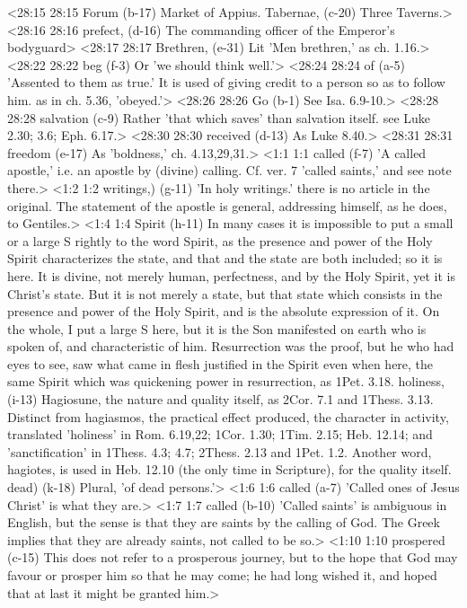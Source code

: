 <28:15 28:15  Forum (b-17)  Market of Appius.
  Tabernae, (c-20)  Three Taverns.>
<28:16 28:16  prefect, (d-16)  The commanding officer of the Emperor's bodyguard>
<28:17 28:17  Brethren, (e-31)  Lit 'Men brethren,' as ch. 1.16.>
<28:22 28:22  beg (f-3)  Or 'we should think well.'>
<28:24 28:24  of (a-5)  'Assented to them as true.' It is used of giving credit to a  person so as to follow him. as in ch. 5.36, 'obeyed.'>
<28:26 28:26  Go (b-1)  See Isa. 6.9-10.>
<28:28 28:28  salvation (c-9)  Rather 'that which saves' than salvation itself. see Luke  2.30; 3.6; Eph. 6.17.>
<28:30 28:30  received (d-13)  As Luke 8.40.>
<28:31 28:31  freedom (e-17)  As 'boldness,' ch. 4.13,29,31.>
<1:1 1:1  called (f-7)  'A called apostle,' i.e. an apostle by (divine) calling. Cf.  ver. 7 'called saints,' and see note there.>
<1:2 1:2  writings,) (g-11)  'In holy writings.' there is no article in the original. The  statement of the apostle is general, addressing himself, as he  does, to Gentiles.>
<1:4 1:4  Spirit (h-11)  In many cases it is impossible to put a small or a large S  rightly to the word Spirit, as the presence and power of the  Holy Spirit characterizes the state, and that and the state are  both included; so it is here. It is divine, not merely human,  perfectness, and by the Holy Spirit, yet it is Christ's state.  But it is not merely a state, but that state which consists in  the presence and power of the Holy Spirit, and is the absolute  expression of it. On the whole, I put a large S here, but it is  the Son manifested on earth who is spoken of, and  characteristic of him. Resurrection was the proof, but he who  had eyes to see, saw what came in flesh justified in the Spirit  even when here, the same Spirit which was quickening power in  resurrection, as 1Pet. 3.18.
  holiness, (i-13)  Hagiosune, the nature and quality itself, as 2Cor. 7.1 and 1Thess. 3.13.  Distinct from hagiasmos, the practical effect  produced, the character in activity, translated 'holiness' in  Rom. 6.19,22; 1Cor. 1.30; 1Tim. 2.15; Heb. 12.14; and  'sanctification' in 1Thess. 4.3; 4.7; 2Thess. 2.13 and 1Pet. 1.2.  Another word, hagiotes, is used in Heb. 12.10 (the only  time in Scripture), for the quality itself.
  dead) (k-18)  Plural, 'of dead persons.'>
<1:6 1:6  called (a-7)  'Called ones of Jesus Christ' is what they are.>
<1:7 1:7  called (b-10)  'Called saints' is ambiguous in English, but the sense is  that they are saints by the calling of God. The Greek implies  that they are already saints, not called to be so.>
<1:10 1:10  prospered (c-15)  This does not refer to a prosperous journey, but to the hope  that God may favour or prosper him so that he may come; he had  long wished it, and hoped that at last it might be granted him.>
